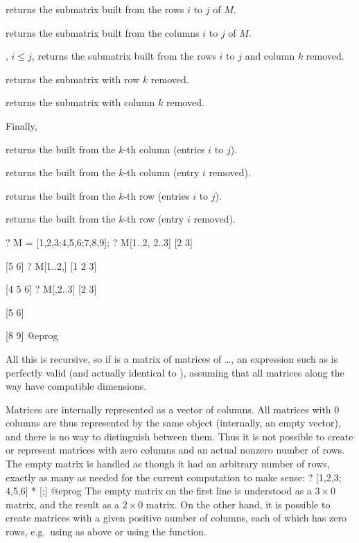 \item {} returns the submatrix built from the rows $i$ to
$j$ of $M$.

\item {} returns the submatrix built from the columns $i$ to
$j$ of $M$.

\item {}, $i\leq j$, returns the submatrix built
from the rows $i$ to $j$ and column $k$ removed.

\item {} returns the submatrix with row $k$ removed.

\item {} returns the submatrix with column $k$ removed.

\noindent Finally,

\item {} returns the  built from the $k$-th column
  (entries $i$ to $j$).

\item {} returns the  built from the $k$-th column
  (entry $i$ removed).

\item {} returns the  built from the $k$-th row
  (entries $i$ to $j$).

\item {} returns the  built from the $k$-th row
  (entry $i$ removed).

\bprog
? M = [1,2,3;4,5,6;7,8,9];
? M[1..2, 2..3]
[2 3]

[5 6]
? M[1..2,]
[1 2 3]

[4 5 6]
? M[,2..3]
[2 3]

[5 6]

[8 9]
@eprog

All this is recursive, so if  is a matrix of matrices of \dots, an
expression such as  is perfectly valid (and actually
identical to ), assuming that all matrices along the way
have compatible dimensions.

 Matrices are internally represented
as a vector of columns. All matrices with $0$ columns are thus represented
by the same object (internally, an empty vector), and there is no way to
distinguish between them. Thus it is not possible to create or represent
matrices with zero columns and an actual nonzero number of rows.
The empty matrix \kbd{[;]} is handled as though it had an arbitrary number of
rows, exactly as many as needed for the current computation to make sense:
\bprog
? [1,2,3; 4,5,6] * [;]
@eprog\noindent
The empty matrix on the first line is understood as a $3\times 0$ matrix, and
the result as a $2\times 0$ matrix. On the other hand, it is possible to
create matrices with a given positive number of columns, each of which has
zero rows, e.g.~using  as above or using the  function.

